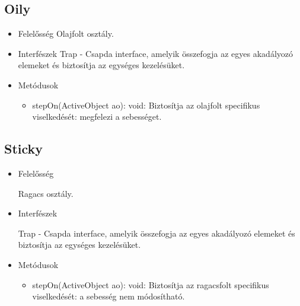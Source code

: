 \subsection{Oily}
\begin{itemize}
	\item Felelősség\newline
	Olajfolt osztály.
	\item Interfészek\newline
	Trap  - Csapda interface, amelyik összefogja az egyes akadályozó elemeket és biztosítja az egységes kezelésüket.
	\item Metódusok
	\begin{itemize}
		\item stepOn(ActiveObject ao): void: Biztosítja az olajfolt specifikus viselkedését: megfelezi a sebességet.
	\end{itemize}
\end{itemize}


\subsection{Sticky}
\begin{itemize}
	\item Felelősség
	
	Ragacs osztály.
	\item Interfészek
	
	Trap - Csapda interface, amelyik összefogja az egyes akadályozó elemeket és biztosítja az egységes kezelésüket.

	\item Metódusok
	\begin{itemize}
		\item stepOn(ActiveObject ao): void: Biztosítja az ragacsfolt specifikus viselkedését: a sebesség nem módosítható.
	\end{itemize}
\end{itemize}

